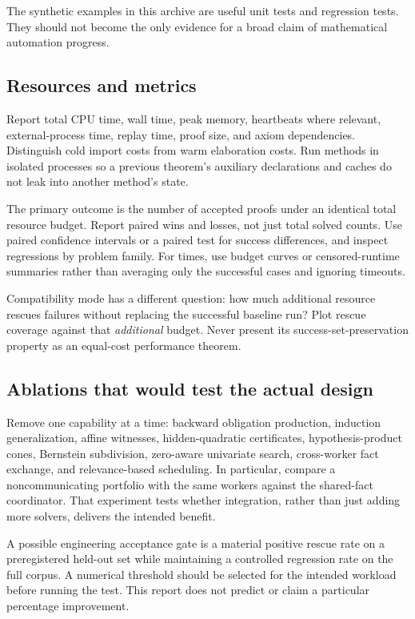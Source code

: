 The synthetic examples in this archive are useful unit tests and regression tests. They should not become the only evidence for a broad claim of mathematical automation progress.

\subsection{Resources and metrics}

Report total CPU time, wall time, peak memory, heartbeats where relevant, external-process time, replay time, proof size, and axiom dependencies. Distinguish cold import costs from warm elaboration costs. Run methods in isolated processes so a previous theorem's auxiliary declarations and caches do not leak into another method's state.

The primary outcome is the number of accepted proofs under an identical total resource budget. Report paired wins and losses, not just total solved counts. Use paired confidence intervals or a paired test for success differences, and inspect regressions by problem family. For times, use budget curves or censored-runtime summaries rather than averaging only the successful cases and ignoring timeouts.

Compatibility mode has a different question: how much additional resource rescues failures without replacing the successful baseline run? Plot rescue coverage against that \emph{additional} budget. Never present its success-set-preservation property as an equal-cost performance theorem.

\subsection{Ablations that would test the actual design}

Remove one capability at a time: backward obligation production, induction generalization, affine witnesses, hidden-quadratic certificates, hypothesis-product cones, Bernstein subdivision, zero-aware univariate search, cross-worker fact exchange, and relevance-based scheduling. In particular, compare a noncommunicating portfolio with the same workers against the shared-fact coordinator. That experiment tests whether integration, rather than just adding more solvers, delivers the intended benefit.

A possible engineering acceptance gate is a material positive rescue rate on a preregistered held-out set while maintaining a controlled regression rate on the full corpus. A numerical threshold should be selected for the intended workload before running the test. This report does not predict or claim a particular percentage improvement.

